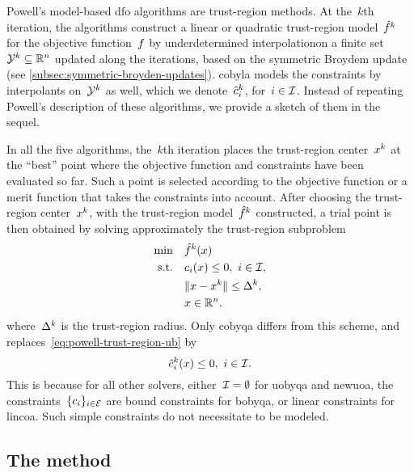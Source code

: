 Powell's model-based \gls{dfo} algorithms are trust-region methods.
At the~$k$th iteration, the algorithms construct a linear or quadratic trust-region model~$\objm[k]$ for the objective function~$f$ by underdetermined interpolationon a finite set~$\xpt[k] \subseteq \R^n$ updated along the iterations, based on the symmetric Broydem update (see \cref{subsec:symmetric-broyden-updates}).
\Gls{cobyla} models the constraints by interpolants on~$\xpt[k]$ as well, which we denote~$\conm[k]{i}$, for~$i \in \mathcal{I}$.
Instead of repeating Powell's description of these algorithms, we provide a sketch of them in the sequel.

In all the five algorithms, the~$k$th iteration places the trust-region center~$\iter[k]$ at the \enquote{best} point where the objective function and constraints have been evaluated so far.
Such a point is selected according to the objective function or a merit function that takes the constraints into account.
After choosing the trust-region center~$\iter[k]$, with the trust-region model~$\objm[k]$ constructed, a trial point is then obtained by solving approximately the trust-region subproblem
\begin{subequations}
    \label{eq:powell-trust-region}
    \begin{align}
        \min        & \quad \objm[k](\iter)\\
        \text{s.t.} & \quad \con{i}(\iter) \le 0, ~ i \in \iub, \label{eq:powell-trust-region-ub}\\
                    & \quad \norm{\iter - \iter[k]} \le \rad[k],\\
                    & \quad \iter \in \R^n. \nonumber
    \end{align}
\end{subequations}
where~$\rad[k]$ is the trust-region radius.
Only \gls{cobyqa} differs from this scheme, and replaces~\cref{eq:powell-trust-region-ub} by
\begin{equation*}
    \conm[k]{i}(\iter) \le 0, ~ i \in \iub.
\end{equation*}
This is because for all other solvers, either~$\mathcal{I} = \emptyset$ for \gls{uobyqa} and \gls{newuoa}, the constraints~$\{c_{i}\}_{i \in \mathcal{E}}$ are bound constraints for \gls{bobyqa}, or linear constraints for \gls{lincoa}.
Such simple constraints do not necessitate to be modeled.

\subsection{The  method}
\label{subsec:cobyla}

